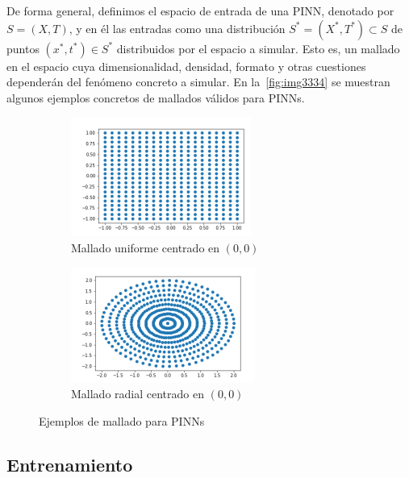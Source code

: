 De forma general, definimos el espacio de entrada de una PINN, denotado por $ S=(X,T) $, y en él las entradas como una distribución $S^*=(X^*,T^*)\subset S$ de puntos $(x^*,t^*)\in S^*$ distribuidos por el espacio a simular. Esto es, un mallado en el espacio cuya dimensionalidad, densidad, formato y otras cuestiones dependerán del fenómeno concreto a simular. En la~\autoref{fig:img3334} se muestran algunos ejemplos concretos de mallados válidos para PINNs. 

\begin{figure}[htbp]

    \begin{subfigure}{0.5\textwidth}
    \centering
    \includegraphics[width=0.7\linewidth]{img/img33.png} 
    \caption{Mallado uniforme centrado en $(0,0)$}
    \label{fig:img33}
    \end{subfigure}   
    \begin{subfigure}{0.5\textwidth}
    \centering
    \includegraphics[width=0.7\linewidth]{img/img34.png}
    \caption{Mallado radial centrado en $(0,0)$}
    \label{fig:img34}
    \end{subfigure}

\caption{Ejemplos de mallado para PINNs}
\label{fig:img3334}
\end{figure}

\subsection{Entrenamiento}\label{sec:7.2.3}


